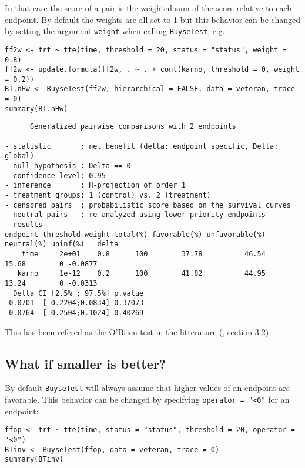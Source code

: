 \documentclass[12pt]{article}
\begin{document}
In that case the score of a pair is the weighted sum of the score
relative to each endpoint. By default the weights are all set to 1 but
this behavior can be changed by setting the argument \texttt{weight} when
calling \texttt{BuyseTest}, e.g.:
\lstset{language=r,label= ,caption= ,captionpos=b,numbers=none}
\begin{lstlisting}
ff2w <- trt ~ tte(time, threshold = 20, status = "status", weight = 0.8)
ff2w <- update.formula(ff2w, . ~ . + cont(karno, threshold = 0, weight = 0.2))
BT.nHw <- BuyseTest(ff2w, hierarchical = FALSE, data = veteran, trace = 0)
summary(BT.nHw)
\end{lstlisting}

\begin{verbatim}
      Generalized pairwise comparisons with 2 endpoints

- statistic       : net benefit (delta: endpoint specific, Delta: global) 
- null hypothesis : Delta == 0 
- confidence level: 0.95 
- inference       : H-projection of order 1
- treatment groups: 1 (control) vs. 2 (treatment) 
- censored pairs  : probabilistic score based on the survival curves
- neutral pairs   : re-analyzed using lower priority endpoints
- results
endpoint threshold weight total(%) favorable(%) unfavorable(%) neutral(%) uninf(%)   delta
    time     2e+01    0.8      100        37.78          46.54      15.68        0 -0.0877
   karno     1e-12    0.2      100        41.82          44.95      13.24        0 -0.0313
  Delta CI [2.5% ; 97.5%] p.value 
-0.0701  [-0.2204;0.0834] 0.37073 
-0.0764  [-0.2504;0.1024] 0.40269
\end{verbatim}
This has been refered as the O’Brien test in the litterature
(\cite{verbeeck2019generalized}, section 3.2).

\clearpage

\subsection{What if smaller is better?}
\label{sec:orgb40170e}
By default \texttt{BuyseTest} will always assume that higher values of an
endpoint are favorable. This behavior can be changed by specifying \texttt{operator = "<0"}
for an endpoint:
\lstset{language=r,label= ,caption= ,captionpos=b,numbers=none}
\begin{lstlisting}
ffop <- trt ~ tte(time, status = "status", threshold = 20, operator = "<0")
BTinv <- BuyseTest(ffop, data = veteran, trace = 0)
summary(BTinv)
\end{lstlisting}
\end{document}
